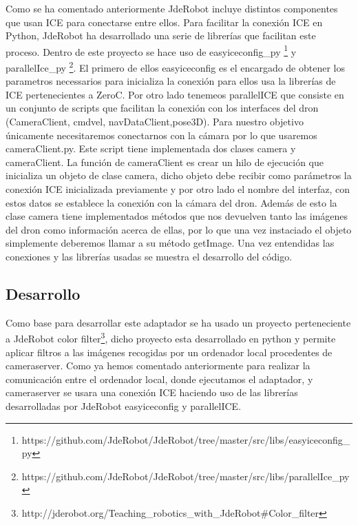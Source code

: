 Como se ha comentado anteriormente JdeRobot incluye distintos componentes que usan ICE para conectarse entre ellos. Para facilitar la conexión ICE en Python, JdeRobot ha desarrollado una serie de librerías que facilitan este proceso. Dentro de este proyecto se hace uso de easyiceconfig\_py \footnote{https://github.com/JdeRobot/JdeRobot/tree/master/src/libs/easyiceconfig_py} y parallelIce\_py \footnote{https://github.com/JdeRobot/JdeRobot/tree/master/src/libs/parallelIce_py}. El primero de ellos easyiceconfig es el encargado de obtener los parametros necessarios para inicializa la conexión para ellos usa la librerías de ICE pertenecientes a ZeroC.
Por otro lado tenemeos parallelICE que consiste en un conjunto de scripts que facilitan la conexión con los interfaces del dron (CameraClient, cmdvel, navDataClient,pose3D). Para nuestro objetivo únicamente necesitaremos conectarnos con la cámara por lo que usaremos cameraClient.py. Este script tiene implementada dos clases camera y cameraClient. La función de cameraClient es crear un hilo de ejecución que inicializa un objeto de clase camera, dicho objeto debe recibir como parámetros la conexión ICE inicializada previamente y por otro lado el nombre del interfaz, con estos datos se establece la conexión con la cámara del dron. Además de esto la clase camera tiene implementados métodos que nos devuelven tanto las imágenes del dron como información acerca de ellas, por lo que una vez instaciado el objeto simplemente deberemos llamar a su método getImage. Una vez entendidas las conexiones y las librerías usadas se muestra el desarrollo del código.



\subsection{Desarrollo}

Como base para desarrollar este adaptador se ha usado un proyecto perteneciente a JdeRobot color filter\footnote{http://jderobot.org/Teaching_robotics_with_JdeRobot#Color\_filter}, dicho proyecto esta desarrollado en python y permite aplicar filtros a las imágenes recogidas por un ordenador local procedentes de cameraserver.
Como ya hemos comentado anteriormente para realizar la comunicación entre el ordenador local, donde ejecutamos el adaptador, y cameraserver se usara una conexión ICE haciendo uso de las librerías desarrolladas por JdeRobot easyiceconfig y parallelICE. 
\\

